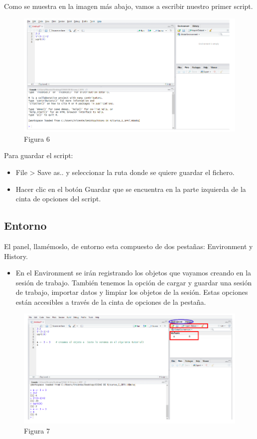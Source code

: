 \documentclass[
]{book}
\providecommand{\tightlist}{%
  \setlength{\itemsep}{0pt}\setlength{\parskip}{0pt}}
\begin{document}
Como se muestra en la imagen más abajo, vamos a escribir nuestro primer script.

\begin{figure}
\centering
\includegraphics{imagenes/07.png}
\caption{Figura 6}
\end{figure}

Para guardar el script:

\begin{itemize}
\item
  File \textgreater{} Save as.. y seleccionar la ruta donde se quiere guardar el fichero.
\item
  Hacer clic en el botón Guardar que se encuentra en la parte izquierda de la cinta de opciones del script.
\end{itemize}

\hypertarget{entorno}{%
\subsection{Entorno}\label{entorno}}

El panel, llamémoslo, de entorno esta compuesto de dos pestañas: Environment y History.

\begin{itemize}
\tightlist
\item
  En el Environment se irán registrando los objetos que vayamos creando en la sesión de trabajo. También tenemos la opción de cargar y guardar una sesión de trabajo, importar datos y limpiar los objetos de la sesión. Estas opciones están accesibles a través de la cinta de opciones de la pestaña.
\end{itemize}

\begin{figure}
\centering
\includegraphics{imagenes/08.png}
\caption{Figura 7}
\end{figure}
\end{document}
